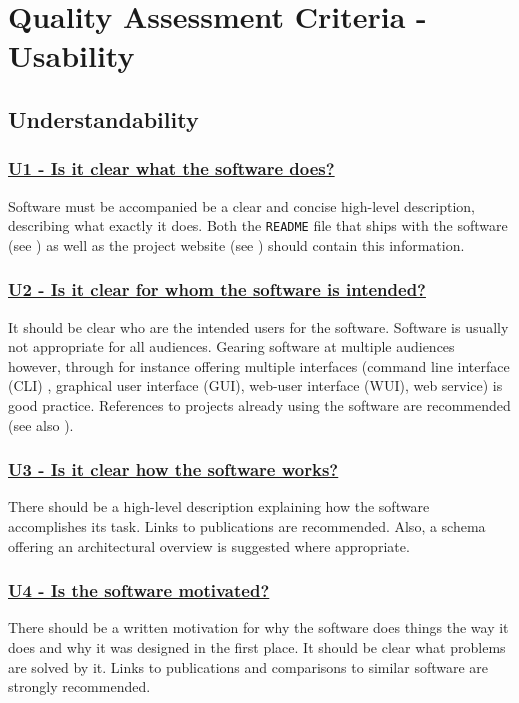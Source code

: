 \documentclass[a4paper,11pt]{article}
\newcommand{\criterion}[2]{\subsubsection*{\underline{#1 - #2}}\label{id:#1}}
\newcommand\CheckTable{%
  \begin{tabular}{ccccc}
    No & Minimal & Adequate & Good & Perfect \\
    0 & 1 & 2 & 3 & 4 \\
    \hline
    $\square$ & $\square$ & $\square$ & $\square$ & $\square$ \\
  \end{tabular}%
}
\newcommand{\refcrit}[1]{%
 \framebox[1.1\width]{\hyperref[id:#1]{#1}}
}
\begin{document}
\section{Quality Assessment Criteria - Usability}\label{sec:usab}


\subsection{Understandability}\label{sec:und}

\newcommand{\uOneID}{U1}
\newcommand{\uOneText}{Is it clear what the software does?}
\criterion{\uOneID}{\uOneText}

Software must be accompanied be a clear and concise high-level description,
describing what exactly it does. Both the \texttt{README} file that ships with
the software (see \refcrit{IS7}) as well as the project website (see
\refcrit{ID2}) should contain
this information. 


\newcommand{\uTwoID}{U2}
\newcommand{\uTwoText}{Is it clear for whom the software is intended?}
\criterion{\uTwoID}{\uTwoText}

It should be clear who are the intended users for the software. Software is
usually not appropriate for all audiences. Gearing software at multiple
audiences however, through for instance offering multiple interfaces (command
line interface (CLI) , graphical user interface (GUI), web-user interface
(WUI), web service) is good practice. References to projects already using the
software are recommended (see also \refcrit{CM1}).


\newcommand{\uThreeID}{U3}
\newcommand{\uThreeText}{Is it clear how the software works?}
\criterion{\uThreeID}{\uThreeText}

There should be a high-level description explaining how the software
accomplishes its task. Links to publications are recommended. Also, a schema
offering an architectural overview is suggested where appropriate. 


\newcommand{\uFourID}{U4}
\newcommand{\uFourText}{Is the software motivated?}
\criterion{\uFourID}{\uFourText}

There should be a written motivation for why the software does things the way
it does and why it was designed in the first place. It should be clear what
problems are solved by it. Links to publications and comparisons to similar
software are strongly recommended.
\end{document}
